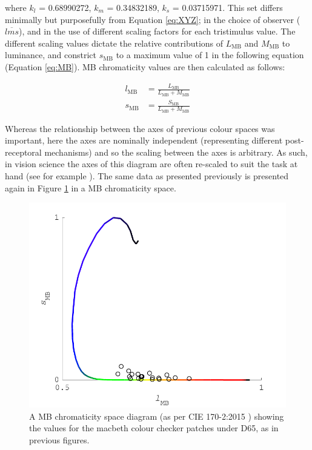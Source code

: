 where $k_{l}$ = 0.68990272, $k_{m}$ = 0.34832189, $k_{s}$ = 0.03715971. This set differs minimally but purposefully from Equation \ref{eq:XYZ}; in the choice of observer ($\overline{lms}$), and in the use of different scaling factors for each tristimulus value. The different scaling values dictate the relative contributions of $L_{\text{MB}}$ and $M_{\text{MB}}$ to luminance, and constrict $s_{\text{MB}}$ to a maximum value of 1 in the following equation (Equation \ref{eq:MB}). \gls{MB} chromaticity values are then calculated as follows:

\begin{subequations}
\begin{align}
l_{\text{MB}}&= \frac{L_{\text{MB}}}{L_{\text{MB}}+M_{\text{MB}}} \\ 
s_{\text{MB}}&= \frac{S_{\text{MB}}}{L_{\text{MB}}+M_{\text{MB}}} 
\end{align}
\label{eq:MB}
\end{subequations}

Whereas the relationship between the axes of previous colour spaces was important, here the axes are nominally independent (representing different post-receptoral mechanisms) and so the scaling between the axes is arbitrary. As such, in vision science the axes of this diagram are often re-scaled to suit the task at hand (see for example \citet{christiansen_chromatic_2017,bosten_what_2015,danilova_superior_2016}). The same data as presented previously is presented again in Figure \ref{fig:lrMB} in a \gls{MB} chromaticity space.

\begin{figure}[htbp]
\includegraphics[max width=\textwidth]{figs/LitRev/ColorimetryDemo5.pdf}
\caption{A \gls{MB} chromaticity space diagram (as per \gls{CIE} 170-2:2015 \citep{cie_cie_2015}) showing the values for the macbeth colour checker patches under D65, as in previous figures.}
\label{fig:lrMB}
\end{figure}

